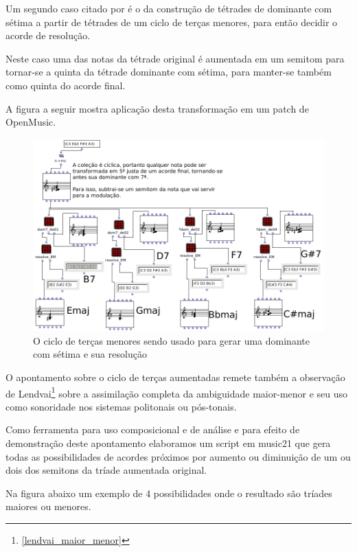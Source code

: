 \documentclass[
	12pt,				%
	openright,			%
	twoside,			%
	a4paper,			%
	english,			%
	french,				%
	spanish,			%
	brazil				%
	]{abntex2}
\begin{document}
Um segundo caso citado por  é o da construção de tétrades de dominante com sétima a partir de tétrades de um ciclo de terças menores, para então decidir o acorde de resolução. 

Neste caso uma das notas da tétrade original é aumentada em um semitom para tornar-se a quinta da tétrade dominante com sétima, para manter-se também como quinta do acorde final.

\pagebreak
A figura a seguir mostra aplicação desta transformação em um patch de OpenMusic.


\begin{figure}[!h]
	\caption{\label{fig_grafico}O ciclo de terças menores sendo usado para gerar uma dominante com sétima e sua resolução   }
	\begin{center}
	    \includegraphics[scale=0.5]{ciclos/setimadominante.png}
	\end{center}
\end{figure}

O apontamento sobre o ciclo de terças aumentadas remete também a observação de Lendvai\footnote{ \autoref{lendvai_maior_menor} } sobre a assimilação completa da ambiguidade maior-menor e seu uso como sonoridade nos sistemas politonais ou pós-tonais. 

Como ferramenta para uso composicional e de análise e para efeito de demonstração deste apontamento elaboramos um script em music21 que gera todas as possibilidades de acordes próximos por aumento ou diminuição de um ou dois dos semitons da tríade aumentada original. 

Na figura abaixo um exemplo de 4 possibilidades onde o resultado são tríades maiores ou menores.
\end{document}
